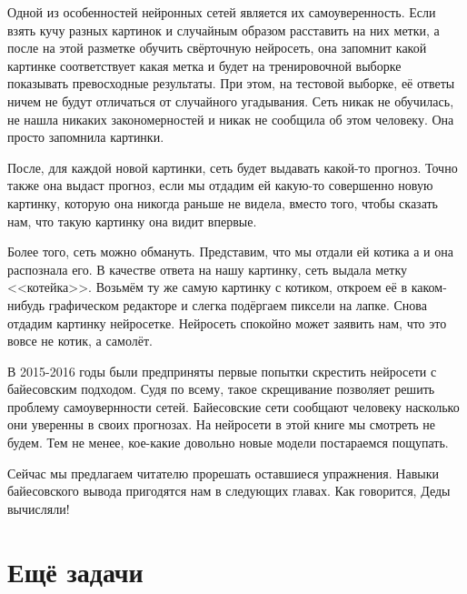 \documentclass[12pt, a4paper, oneside]{extreport}
\theoremstyle{plain}              %
\theoremstyle{definition}         %
\begin{document}
Одной из особенностей нейронных сетей является их самоуверенность. Если взять кучу разных картинок и случайным образом расставить на них метки, а после на этой разметке обучить свёрточную нейросеть, она запомнит какой картинке соответствует какая метка и будет на тренировочной выборке показывать превосходные результаты. При этом, на тестовой выборке, её ответы ничем не будут отличаться от случайного угадывания. Сеть никак не обучилась, не нашла никаких закономерностей и никак не сообщила об этом человеку. Она просто запомнила картинки.  

После, для каждой новой картинки, сеть будет выдавать какой-то прогноз. Точно также она выдаст прогноз, если мы отдадим ей какую-то совершенно новую картинку, которую она никогда раньше не видела, вместо того, чтобы сказать нам, что такую картинку она видит впервые. 

Более того, сеть можно обмануть. Представим, что мы отдали ей котика а и она распознала его. В качестве ответа на нашу картинку, сеть выдала метку <<котейка>>. Возьмём ту же самую картинку с котиком, откроем её в каком-нибудь графическом редакторе и слегка подёргаем пиксели на лапке. Снова отдадим картинку нейросетке. Нейросеть спокойно может заявить нам, что это вовсе не котик, а самолёт. 

В 2015-2016 годы были предприняты первые попытки скрестить нейросети с байесовским подходом. Судя по всему, такое скрещивание позволяет решить проблему самоувернности сетей. Байесовские сети сообщают человеку насколько они уверенны в своих прогнозах. На нейросети в этой книге мы смотреть не будем. Тем не менее, кое-какие довольно новые модели постараемся пощупать.

Сейчас мы предлагаем читателю прорешать оставшиеся упражнения. Навыки байесовского вывода пригодятся нам в следующих главах.  Как говорится, Деды вычисляли! 


\section{Ещё задачи} 
\end{document}
